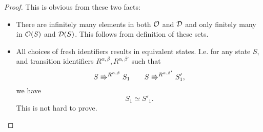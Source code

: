 \begin{proof}
  This is obvious from these two facts:
  \begin{itemize}
    \item There are infinitely many elements in both $\mathcal{O}$ and $\mathcal{D}$ and
      only finitely many in $\mathcal{O}(S)$ and $\mathcal{D}(S)$. This follows from
      definition of these sets.
    \item All choices of fresh identifiers results in equivalent states. I.e.
      for any state $S$, and transition identifiers $R^{\alpha, \beta},
      R^{\alpha, \beta'}$ such that 
      \begin{equation*}
        S \Rrightarrow^{R^{\alpha, \beta}} S_1 \quad\quad S
        \Rrightarrow^{R^{\alpha, \beta'}} S'_1,
      \end{equation*}
      we have
      \begin{equation*}
        S_1 \simeq S'_1.
      \end{equation*}
      This is not hard to prove.
  \end{itemize}
\end{proof}

